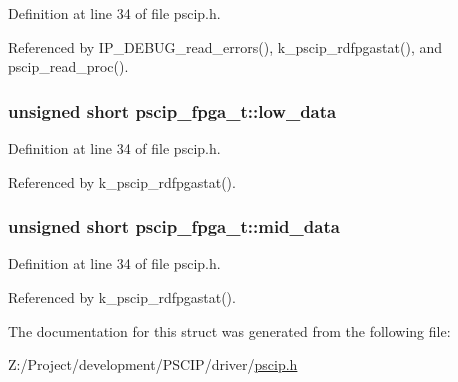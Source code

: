 Definition at line 34 of file pscip.h.

Referenced by IP\_\-DEBUG\_\-read\_\-errors(), k\_\-pscip\_\-rdfpgastat(), and pscip\_\-read\_\-proc().\hypertarget{structpscip__fpga__t_ab01ca33bd95494de31b58df20fd9d48}{
\subsubsection[{low\_\-data}]{\setlength{\rightskip}{0pt plus 5cm}unsigned short {\bf pscip\_\-fpga\_\-t::low\_\-data}}}
\label{structpscip__fpga__t_ab01ca33bd95494de31b58df20fd9d48}




Definition at line 34 of file pscip.h.

Referenced by k\_\-pscip\_\-rdfpgastat().\hypertarget{structpscip__fpga__t_89ede1d1b972a6599fee27626c83c6aa}{
\subsubsection[{mid\_\-data}]{\setlength{\rightskip}{0pt plus 5cm}unsigned short {\bf pscip\_\-fpga\_\-t::mid\_\-data}}}
\label{structpscip__fpga__t_89ede1d1b972a6599fee27626c83c6aa}




Definition at line 34 of file pscip.h.

Referenced by k\_\-pscip\_\-rdfpgastat().

The documentation for this struct was generated from the following file:\begin{CompactItemize}
\item 
Z:/Project/development/PSCIP/driver/\hyperlink{pscip_8h}{pscip.h}\end{CompactItemize}
